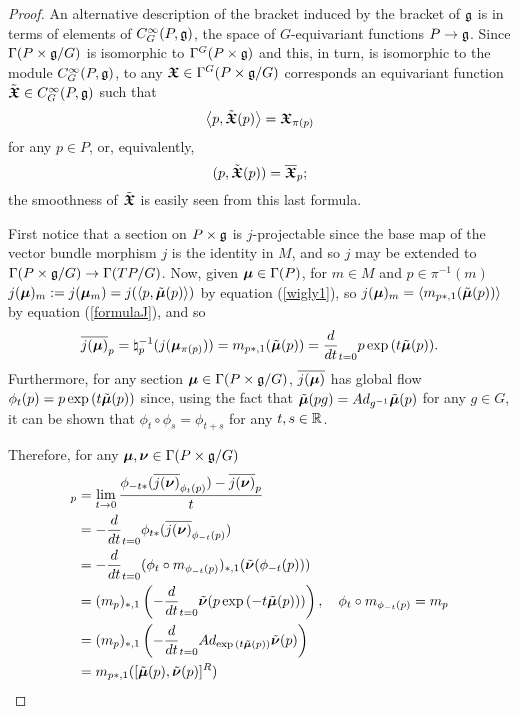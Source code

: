 \begin{proof}
An alternative description of the bracket induced by the bracket of $\mathfrak{g}$ is in terms of elements of $C^\infty_G(P, \mathfrak{g})$, the space of $G$-equivariant functions $P \to \mathfrak{g}$. Since $\Gamma(P \times \mathfrak{g}/G)$ is isomorphic to $\Gamma^G(P \times \mathfrak{g})$ and this, in turn, is isomorphic to the module $C^\infty_G(P, \mathfrak{g})$, to any $\bm{\mathfrak{X}} \in \Gamma^G(P \times \mathfrak{g}/G)$ corresponds an equivariant function $\Tilde{\bm{\mathfrak{X}}} \in C^\infty_G(P, \mathfrak{g})$ such that
\begin{equation} \label{wigly1}
    \left\langle p, \tilde{\bm{\mathfrak{X}}}(p) \right\rangle = \bm{\mathfrak{X}}_{\pi(p)} 
\end{equation}
for any $p \in P$, or, equivalently,
\begin{equation}\label{wigly2}
    (p, \tilde{\bm{\mathfrak{X}}}(p)) = \overline{\bm{\mathfrak{X}}}_{p};
\end{equation} the smoothness of $\tilde{\bm{\mathfrak{X}}}$ is easily seen from this last formula.

First notice that a section on $P \times \mathfrak{g}$ is $j$-projectable since the base map of the vector bundle morphism $j$ is the identity in $M$, and so $j$ may be extended to $\Gamma(P \times \mathfrak{g}/G) \to \Gamma(TP/G)$. Now, given $\bm{\mu} \in \Gamma(P)$, for $m \in M$ and $p \in \pi^{-1}(m)$ $j(\bm{\mu})_m := j(\bm{\mu}_m) = j(\left\langle p, \tilde{\bm{\mu}}(p) \right\rangle)$ by equation (\ref{wigly1}), so $j(\bm{\mu})_m = \left\langle m_{p*, 1}(\tilde{\bm{\mu}}(p)) \right\rangle$ by equation (\ref{formulaJ}), and so
\begin{equation}
    \overline{j(\bm{\mu})}_p = \natural_p^{-1}(j(\bm{\mu}_{\pi(p)})) = m_{p*,1}(\tilde{\bm{\mu}}(p)) = \frac{d}{dt}_{t=0} p \exp{(t \tilde{\ensuremath{\bm{\mu}}}(p))}.
\end{equation}
Furthermore, for any section $\bm{\mu} \in \Gamma(P \times \mathfrak{g}/G)$, $\overline{j(\bm{\mu})}$ has global flow $\phi_t(p) = p \exp{(t \tilde{\sect \mu}(p))}$ since, using the fact that $\Tilde{\bm{\mu}}(pg) = Ad_{g^{-1}} \Tilde{\bm{\mu}}(p)$ for any $g \in G$, it can be shown that $\phi_t \circ \phi_s = \phi_{t + s}$ for any $t, s \in \mathbb{R}$.

Therefore, for any $\bm{\mu}, \bm{\nu} \in \Gamma(P \times \mathfrak{g}/ G)$
\begin{align*}
    [\upsect{j(\sect \mu)}, \upsect{j(\sect \nu)}]_p 
    &= \lim_{t \to 0} \frac{\phi_{-t*}(\upsect{j(\sect \nu)}_{\phi_t(p)})  - \upsect{j(\sect \nu)}_{p} }{t}\\
    &= - \frac{d}{dt}_{t = 0} \phi_{t*} (\upsect{j(\sect \nu)}_{\phi_{-t}(p)}) \\
    &= - \frac{d}{dt}_{t = 0} (\phi_{t} \circ m_{\phi_{-t}(p)})_{*, 1} (\tilde{\sect \nu}(\phi_{-t}(p)))\\
    &= (m_{p})_{*, 1} \left(- \frac{d}{dt}_{t = 0} \tilde{\sect \nu}(p \exp{(-t \tilde{\sect \mu}(p))}) \right), \quad \phi_t \circ m_{\phi_{-t}(p)} = m_p \\
    &= (m_{p})_{*, 1} \left(- \frac{d}{dt}_{t = 0} Ad_{\exp{(t \tilde{\sect \mu}(p))}}\tilde{\sect \nu}(p) \right) \\
    &= m_{p*, 1} ([\tilde{\sect \mu}(p), \tilde{\sect \nu}(p)]^R)
\end{align*}


\end{proof}
